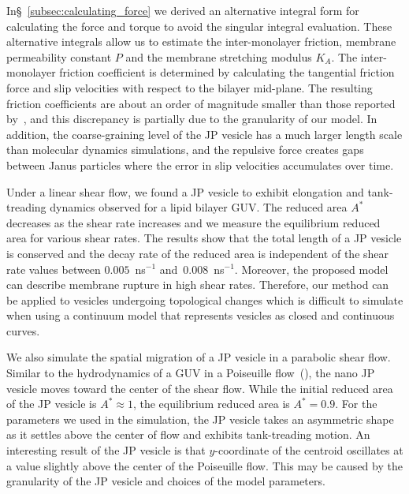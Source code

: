 \documentclass[lineno]{jfm}
\begin{document}
In\S~\ref{subsec:calculating_force} we derived an alternative integral form for calculating the force and torque to avoid the singular integral evaluation. These alternative integrals allow us to 
%
%
estimate the inter-monolayer friction, membrane permeability constant $P$ and the membrane
stretching modulus $K_A$. 
The inter-monolayer friction coefficient is determined by
calculating the tangential friction force and slip velocities with
respect to the bilayer mid-plane. The resulting friction coefficients are
about an order of magnitude smaller than those reported
by~\cite{denOtter2007}, and this discrepancy is partially due to the
granularity of our model. In addition, the coarse-graining level of the
JP vesicle has a much larger length scale than molecular dynamics
simulations, and the repulsive force creates gaps between Janus
particles where the error in slip velocities accumulates over time.


Under a linear shear flow, we found a JP vesicle to exhibit elongation and tank-treading dynamics observed for a lipid bilayer GUV.
%
%
The reduced area $A^*$ decreases as the shear rate increases
and we measure the equilibrium reduced area for various shear rates. The
results show that the total length of a JP vesicle is conserved and the
decay rate of the reduced area is independent of the shear rate values
between $0.005$~ns$^{-1}$ and~$0.008$~ns$^{-1}$. Moreover, the proposed
model can describe membrane rupture in high shear rates. Therefore, our
method can be applied to vesicles undergoing topological changes which
is difficult to simulate when using a continuum model that represents
vesicles as closed and continuous curves.
%
%


We also simulate the spatial migration of a JP vesicle in a
parabolic shear flow. 
%
Similar to the hydrodynamics of a GUV in a Poiseuille flow~(\cite{Kaoui09, dan-vla-mis2009, cou-kao-pod-mis2008}),
the nano JP vesicle moves toward the center of the shear flow.
While the initial reduced area of the JP vesicle is $A^*
\approx 1$, the equilibrium reduced area is $A^*=0.9$. 
For the parameters we used in the simulation, the JP vesicle takes an asymmetric shape as it settles above the center of flow and exhibits tank-treading motion.
An
interesting result of the JP vesicle is that $y$-coordinate of the
centroid oscillates at a value slightly above the center of the
Poiseuille flow. This may be caused by the granularity of the JP vesicle
and choices of the model parameters.
\end{document}
